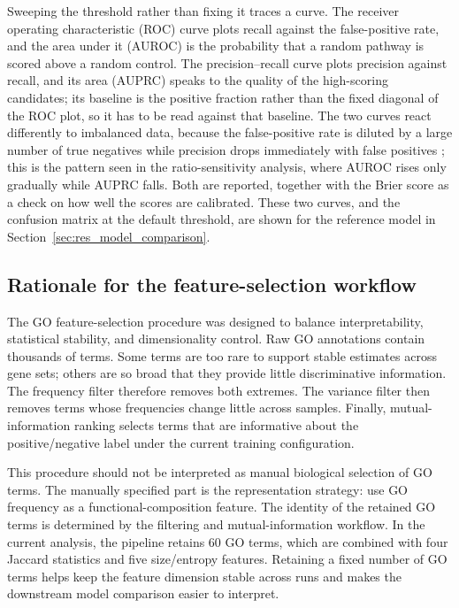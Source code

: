 \documentclass[12pt,twoside]{article}
\begin{document}
Sweeping the threshold rather than fixing it traces a curve. The receiver operating characteristic (ROC) curve plots recall against the false-positive rate, and the area under it (AUROC) is the probability that a random pathway is scored above a random control. The precision--recall curve plots precision against recall, and its area (AUPRC) speaks to the quality of the high-scoring candidates; its baseline is the positive fraction rather than the fixed diagonal of the ROC plot, so it has to be read against that baseline. The two curves react differently to imbalanced data, because the false-positive rate is diluted by a large number of true negatives while precision drops immediately with false positives \citep{saito2015precision}; this is the pattern seen in the ratio-sensitivity analysis, where AUROC rises only gradually while AUPRC falls. Both are reported, together with the Brier score as a check on how well the scores are calibrated. These two curves, and the confusion matrix at the default threshold, are shown for the reference model in Section~\ref{sec:res_model_comparison}.

\subsection{Rationale for the feature-selection workflow}
\label{sec:methods_feature_rationale}

The GO feature-selection procedure was designed to balance interpretability, statistical stability, and dimensionality control. Raw GO annotations contain thousands of terms. Some terms are too rare to support stable estimates across gene sets; others are so broad that they provide little discriminative information. The frequency filter therefore removes both extremes. The variance filter then removes terms whose frequencies change little across samples. Finally, mutual-information ranking selects terms that are informative about the positive/negative label under the current training configuration.

This procedure should not be interpreted as manual biological selection of GO terms. The manually specified part is the representation strategy: use GO frequency as a functional-composition feature. The identity of the retained GO terms is determined by the filtering and mutual-information workflow. In the current analysis, the pipeline retains 60 GO terms, which are combined with four Jaccard statistics and five size/entropy features. Retaining a fixed number of GO terms helps keep the feature dimension stable across runs and makes the downstream model comparison easier to interpret.
\end{document}

